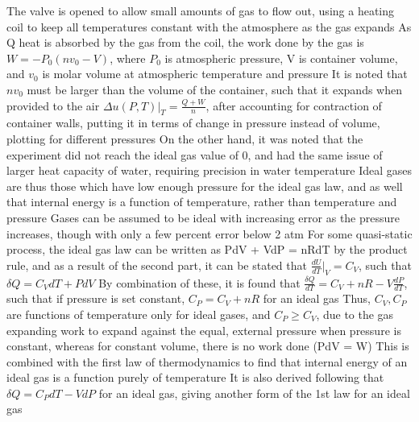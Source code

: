 \documentclass[11 pt, twoside]{article}
\newenvironment{outline*}
{
	\begin{outline}[enumerate]
	}
	{\end{outline}
}
\begin{document}
\begin{outline*}
\4 The valve is opened to allow small amounts of gas to flow out, using a heating coil to keep all temperatures constant with the atmosphere as the gas expands
\4 As Q heat is absorbed by the gas from the coil, the work done by the gas is $W = -P_0(nv_0 - V)$, where $P_0$ is atmospheric pressure, V is container volume, and $v_0$ is molar volume at atmospheric temperature and pressure
\4 It is noted that $nv_0$ must be larger than the volume of the container, such that it expands when provided to the air
\4 $\Delta u(P, T)|_T = \frac{Q + W}{n}$, after accounting for contraction of container walls, putting it in terms of change in pressure instead of volume, plotting for different pressures
\3 On the other hand, it was noted that the experiment did not reach the ideal gas value of 0, and had the same issue of larger heat capacity of water, requiring precision in water temperature
\1 Ideal gases are thus those which have low enough pressure for the ideal gas law, and as well that internal energy is a function of temperature, rather than temperature and pressure
\2 Gases can be assumed to be ideal with increasing error as the pressure increases, though with only a few percent error below 2 atm
\2 For some quasi-static process, the ideal gas law can be written as PdV + VdP =  nRdT by the product rule, and as a result of the second part, it can be stated that $\frac{dU}{dT}|_V = C_V$, such that $\delta Q = C_VdT + PdV$
\3 By combination of these, it is found that $\frac{\delta Q}{dT} = C_V + nR - V\frac{dP}{dT}$, such that if pressure is set constant, $C_P = C_V + nR$ for an ideal gas
\3 Thus, $C_V, C_P$ are functions of temperature only for ideal gases, and $C_P \geq C_V$, due to the gas expanding work to expand against the equal, external pressure when pressure is constant, whereas for constant volume, there is no work done (PdV = W)
\3 This is combined with the first law of thermodynamics to find that internal energy of an ideal gas is a function purely of temperature
\2 It is also derived following that $\delta Q = C_PdT - VdP$ for an ideal gas, giving another form of the 1st law for an ideal gas
\end{outline*}
\end{document}
